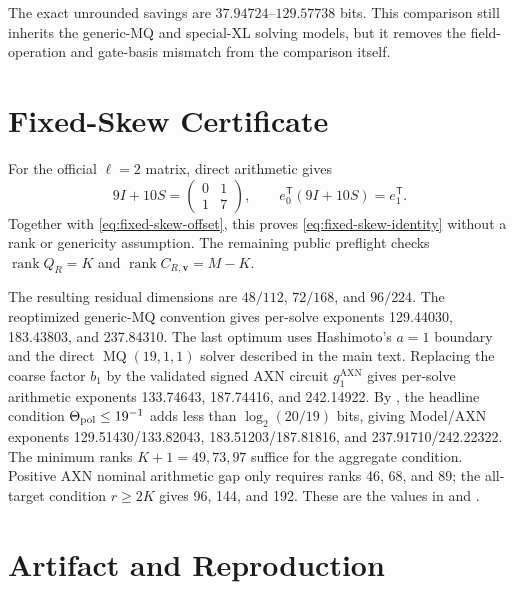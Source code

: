 \documentclass[11pt]{article}
\newcommand{\rank}{\operatorname{rank}}
\newcommand{\transpose}{\mathsf T}
\begin{document}
The exact unrounded savings are $37.94724$--$129.57738$ bits.  This comparison
still inherits the generic-MQ and special-XL solving models, but it removes the
field-operation and gate-basis mismatch from the comparison itself.

\section{Fixed-Skew Certificate}\label{app:fixed-skew}

For the official $\ell=2$ matrix, direct arithmetic gives
\[
 9I+10S=\begin{pmatrix}0&1\\1&7\end{pmatrix},
 \qquad e_0^\transpose(9I+10S)=e_1^\transpose.
\]
Together with \eqref{eq:fixed-skew-offset}, this proves
\eqref{eq:fixed-skew-identity} without a rank or genericity assumption.  The
remaining public preflight checks $\rank Q_R=K$ and
$\rank C_{R,\mathbf v}=M-K$.

The resulting residual dimensions are $48/112$, $72/168$, and $96/224$.
The reoptimized generic-MQ convention gives per-solve exponents 129.44030,
183.43803, and 237.84310.  The last optimum uses Hashimoto's $a=1$ boundary
and the direct $\operatorname{MQ}(19,1,1)$ solver described in the main text.
Replacing the coarse factor $b_1$ by the validated signed AXN circuit
$g_1^{\mathrm{AXN}}$ gives per-solve arithmetic exponents 133.74643,
187.74416, and 242.14922.  By , the headline condition
$\Theta_{\rm pol}\le19^{-1}$ adds less than $\log_2(20/19)$ bits, giving
Model/AXN exponents
129.51430/133.82043, 183.51203/187.81816, and
237.91710/242.22322.  The minimum ranks $K+1=49,73,97$ suffice
for the aggregate condition.  Positive AXN nominal arithmetic gap only requires
ranks 46, 68, and 89; the all-target condition $r\ge2K$ gives 96, 144, and
192.
These are the values in  and
.

\section{Artifact and Reproduction}\label{app:artifact}
\end{document}
